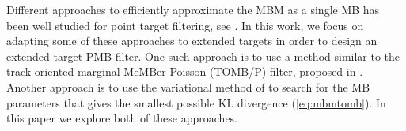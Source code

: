\documentclass[journal]{IEEEtran}
\begin{document}
Different approaches to efficiently approximate the MBM as a single MB has been well studied for point target filtering, see \cite{pmbmpoint,variational}. In this work, we focus on adapting some of these approaches to extended targets in order to design an extended target PMB filter. One such approach is to use a method similar to the track-oriented marginal MeMBer-Poisson (TOMB/P) filter, proposed in \cite{pmbmpoint}. Another approach is to use the variational method of \cite{variational} to search for the MB parameters that gives the smallest possible KL divergence (\ref{eq:mbmtomb}). In this paper we explore both of these approaches.




\end{document}
